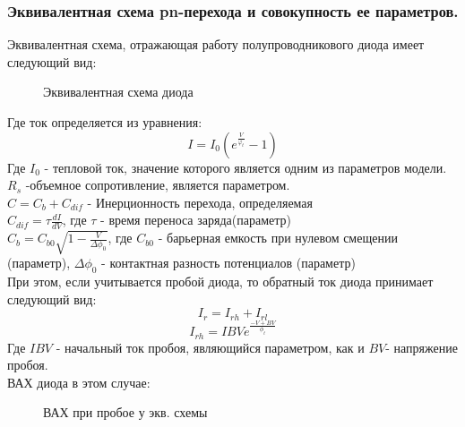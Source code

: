 \subsubsection{Эквивалентная схема pn-перехода и совокупность ее параметров.}
Эквивалентная схема, отражающая работу полупроводникового диода имеет следующий вид:


\begin{center}
	\begin{figure}[h!]
		\caption{Эквивалентная схема диода}	
		\label{pic:pn-eqiv}
	\end{figure}
\end{center}

Где ток определяется из уравнения:
\begin{equation}
I = I_0 \left( e^{\frac{V}{\varphi_t}}-1 \right)
\end{equation}
Где $I_0$ - тепловой ток, значение которого является одним из параметров модели.\\
$R_s$ -объемное сопротивление, является параметром.\\
$C = C_b+ C_{dif}$ - Инерционность перехода, определяемая \\
$C_{dif} = \tau \frac{d I}{d V}$, где $\tau$ - время переноса заряда(параметр)\\
$C_b = C_{b0} \sqrt{1 - \frac{V}{\Delta \phi_0}}$, где $C_{b0}$ - барьерная емкость при нулевом смещении (параметр),
$\Delta \phi_0$ - контактная разность потенциалов (параметр)\\
При этом, если учитывается пробой диода, то обратный ток диода принимает следующий вид:
\begin{equation}
I_r = I_{rh} + I_{rl}
\end{equation}
\begin{equation}
I_{rh} = IBV e^{\frac{- V + BV}{\phi_t}}
\end{equation}
Где $IBV$ - начальный ток пробоя, являющийся параметром, как и $BV$- напряжение пробоя. \\

ВАХ диода в этом случае:


\begin{center}
	\begin{figure}[h!]
		\caption{ВАХ при пробое у экв. схемы}	
		\label{pic:pn-rev_VAH}
	\end{figure}
\end{center}

\pagebreak
